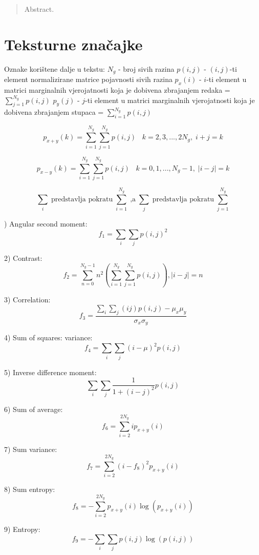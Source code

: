 \documentclass[times, utf8, zavrsni]{fer}
\begin{document}
\begin{abstract}
Abstract.

\end{abstract}

\appendix

\chapter{Teksturne značajke}

Oznake korištene dalje u tekstu:
\bigbreak
\(N_g\) - broj sivih razina
\(p(i,j)\) - \((i,j)\)-ti element normalizirane matrice pojavnosti sivih razina
\bigbreak
\(p_x(i)\) - \(i\)-ti element u matrici marginalnih vjerojatnosti koja je dobivena 
zbrajanjem redaka = \(\sum_{j=1}^{N_g}p(i,j)\)
\bigbreak
\(p_y(j)\) - \(j\)-ti element u matrici marginalnih vjerojatnosti koja je dobivena 
zbrajanjem stupaca = \(\sum_{i=1}^{N_g}p(i,j)\)

\[
p_{x+y}(k)=\sum_{i=1}^{N_g} \sum_{j=1}^{N_g} p(i,j) \;\;\; k=2,3,...,2N_g, \; i+j=k
\]

\[
p_{x-y}(k)=\sum_{i=1}^{N_g} \sum_{j=1}^{N_g} p(i,j) \;\;\; k=0,1,...,N_g-1, \; \left|i-j\right|=k
\]

\[
\sum_i \; \textrm{predstavlja pokratu} \; \sum_{i=1}^{N_g} \; \textrm{,a} \;
\sum_{j} \; \textrm{predstavlja pokratu} \; \sum_{j=1}^{N_g}
\]

) Angular second moment:
\[
f_1 = \sum_{i}\sum_{j}p(i,j)^2
\]

2) Contrast:
\[
f_2 = \sum_{n=0}^{N_g-1}n^2 \left( \sum_{i=1}^{N_g}\sum_{j=1}^{N_g}p(i,j) \right), \left| i-j \right| = n
\]

3) Correlation:
\[
f_3 = \frac{\sum_i\sum_j\left(ij\right)p(i,j) - \mu_x\mu_y}{\sigma_x\sigma_y}
\]

4) Sum of squares: variance:
\[
f_4 = \sum_i\sum_j(i-\mu)^2p(i,j)
\]

5) Inverse difference moment:
\[
\sum_i\sum_j \frac{1}{1+(i-j)^2}p(i,j)
\]

6) Sum of average:
\[
f_6 = \sum_{i=2}^{2N_g}ip_{x+y}(i)
\]

7) Sum variance:
\[
f_7 = \sum_{i=2}^{2N_g}(i-f_8)^2p_{x+y}(i)
\]

8) Sum entropy:
\[
f_8 = -\sum_{i=2}^{2N_g}p_{x+y}(i)\log(p_{x+y}(i))
\]

9) Entropy:
\[
f_9 = -\sum_i\sum_j p(i,j)\log(p(i,j))
\]
\end{document}
